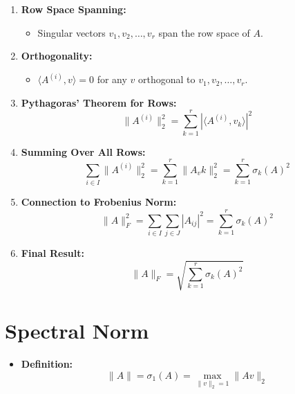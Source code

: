 \documentclass{article}
\begin{document}
\begin{enumerate}[label=\textbullet]
    \item \textbf{Row Space Spanning:}
    \begin{itemize}
        \item Singular vectors \( v_1, v_2, \ldots, v_r \) span the row space of \( A \).
    \end{itemize}
    
    \item \textbf{Orthogonality:}
    \begin{itemize}
        \item \( \langle A^{(i)}, v \rangle = 0 \) for any \( v \) orthogonal to \( v_1, v_2, \ldots, v_r \).
    \end{itemize}
    
    \item \textbf{Pythagoras' Theorem for Rows:}
    \[
    \| A^{(i)} \|_2^2 = \sum_{k=1}^{r} | \langle A^{(i)}, v_k \rangle |^2
    \]
    
    \item \textbf{Summing Over All Rows:}
    \[
    \sum_{i \in I} \| A^{(i)} \|_2^2 = \sum_{k=1}^{r} \| A_v k \|_2^2 = \sum_{k=1}^{r} \sigma_k(A)^2
    \]
    
    \item \textbf{Connection to Frobenius Norm:}
    \[
    \| A \|_F^2 = \sum_{i \in I} \sum_{j \in J} | A_{ij} |^2 = \sum_{k=1}^{r} \sigma_k(A)^2
    \]
    
    \item \textbf{Final Result:}
    \[
    \| A \|_F = \sqrt{ \sum_{k=1}^{r} \sigma_k(A)^2 }
    \]
\end{enumerate}











\section*{Spectral Norm}
\begin{itemize}
    \item \textbf{Definition:}
    \[
    \|A\| = \sigma_1(A) = \max_{\|v\|_2=1} \|Av\|_2
    \]
\end{itemize}
\end{document}
